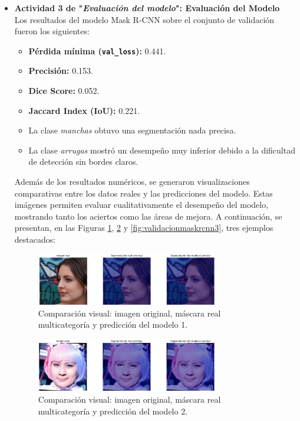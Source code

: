 \begin{enumerate}
\begin{itemize}
    \item \textbf{Actividad 3 de "\textit{Evaluación del modelo}": Evaluación del Modelo} \\
    Los resultados del modelo Mask R-CNN sobre el conjunto de validación fueron los siguientes:
    \begin{itemize}
      \item \textbf{Pérdida mínima (\texttt{val\_loss}):} 0.441.
      \item \textbf{Precisión:} 0.153.
      \item \textbf{Dice Score:} 0.052.
      \item \textbf{Jaccard Index (IoU):} 0.221.
      \item La clase \emph{manchas} obtuvo una segmentación nada precisa.
      \item La clase \emph{arrugas} mostró un desempeño muy inferior debido a la dificultad de detección sin bordes claros.
    \end{itemize}
  
    Además de los resultados numéricos, se generaron visualizaciones comparativas entre los datos reales y las predicciones del modelo. Estas imágenes permiten evaluar cualitativamente el desempeño del modelo, mostrando tanto los aciertos como las áreas de mejora. A continuación, se presentan, en las Figuras \ref{fig:validacionmaskrcnn1}, \ref{fig:validacionmaskrcnn2} y \ref{fig:validacionmaskrcnn3}, tres ejemplos destacados:
  
    \vspace{0.5cm}
  
    \begin{figure}[H]
      \centering
      \includegraphics[width=0.75\textwidth]{4/figures/maskrcnn1.png}
      \caption{Comparación visual: imagen original, máscara real multicategoría y predicción del modelo 1.}
      \label{fig:validacionmaskrcnn1}
    \end{figure}
  
    \begin{figure}[H]
      \centering
      \includegraphics[width=0.75\textwidth]{4/figures/maskrcnn2.png}
      \caption{Comparación visual: imagen original, máscara real multicategoría y predicción del modelo 2.}
      \label{fig:validacionmaskrcnn2}
    \end{figure}
  

\end{itemize}
\end{enumerate}

